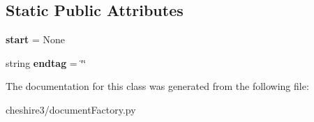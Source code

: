 \subsection*{Static Public Attributes}
\begin{DoxyCompactItemize}
\item 
\hypertarget{classcheshire3_1_1document_factory_1_1_xml_document_stream_aa98a166806d93bf0df3f321b4b873149}{{\bfseries start} = None}\label{classcheshire3_1_1document_factory_1_1_xml_document_stream_aa98a166806d93bf0df3f321b4b873149}

\item 
\hypertarget{classcheshire3_1_1document_factory_1_1_xml_document_stream_a61d188d8cf568cd32feb5a24d415ca9e}{string {\bfseries endtag} = \char`\"{}\char`\"{}}\label{classcheshire3_1_1document_factory_1_1_xml_document_stream_a61d188d8cf568cd32feb5a24d415ca9e}

\end{DoxyCompactItemize}


The documentation for this class was generated from the following file\-:\begin{DoxyCompactItemize}
\item 
cheshire3/document\-Factory.\-py\end{DoxyCompactItemize}
